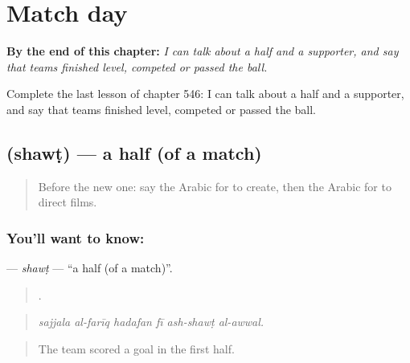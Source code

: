
\chapter{Match day}
\label{ch:ar-match-day}

\begin{chapteropening}
\textbf{By the end of this chapter:} \emph{I can talk about a half and a supporter, and say that teams finished level, competed or passed the ball.}

Complete the last lesson of chapter 546: I can talk about a half and a supporter, and say that teams finished level, competed or passed the ball.
\end{chapteropening}

\section[\texorpdfstring{\ar{شوط} (shawṭ)}{شوط (shawṭ)}]{ (shawṭ) — a half (of a match)}

\label{lesson:AR-C546-shawt}



\begin{quote}
Before the new one: say the Arabic for to create, then the Arabic for to direct films.
\end{quote}

\subsection*{You'll want to know: }
\textbf{} — \emph{shawṭ} — \textquotedblleft{}a half (of a match)\textquotedblright{}.

\begin{quote}
     .
\end{quote}

\begin{quote}
\emph{sajjala al-farīq hadafan fī ash-shawṭ al-awwal.}
\end{quote}

\begin{quote}
The team scored a goal in the first half.
\end{quote}

